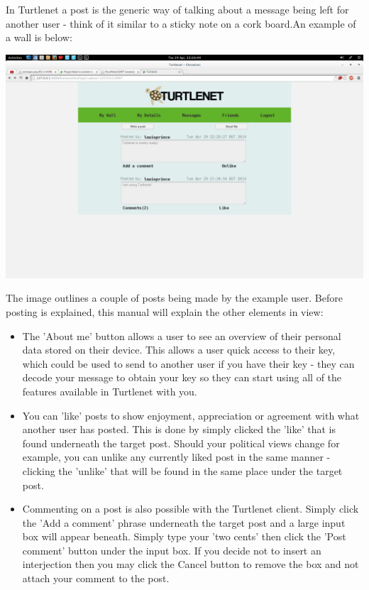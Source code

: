 In Turtlenet a post is the generic way of talking about a message being left for
another user - think of it similar to a sticky note on a cork board.An example
of a wall is below:

\includegraphics[scale=0.2]{../Screenshots/Screenshot from 2014-04-29 22-26-44}

The image outlines a couple of posts being made by the example user.  Before 
posting is explained, this manual will explain the other elements in view:

\begin{itemize}
\item The 'About me' button allows a user to see an overview of their personal
      data stored on their device.  This allows a user quick access to their 
      key, which could be used to send to another user if you have their key - 
      they can decode your message to obtain your key so they can start using 
      all of the features available in Turtlenet with you.
\item You can 'like' posts to show enjoyment, appreciation or agreement with
      what another user has posted.  This is done by simply clicked the 'like'
      that is found underneath the target post.  Should your political views
      change for example, you can unlike any currently liked post in the same
      manner - clicking the 'unlike' that will be found in the same place under
      the target post.
\item Commenting on a post is also possible with the Turtlenet client.  Simply
      click the 'Add a comment' phrase underneath the target post and a large
      input box will appear beneath.  Simply type your 'two cents' then click
      the 'Post comment' button under the input box.  If you decide not to
      insert an interjection then you may click the Cancel button to remove the
      box and not attach your comment to the post.
\end{itemize}

